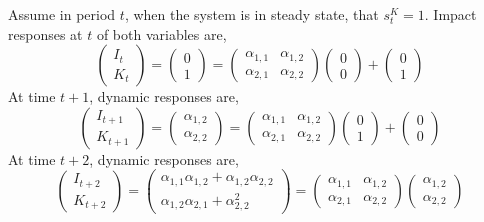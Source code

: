 \documentclass{article}
\begin{document}
Assume in period $t$, when the system is in steady state, that $s_t^K = 1$. Impact responses at $t$ of both variables are,
\begin{equation}\label{eq:K_responses_zero}
\begin{pmatrix}
I_t \\
K_t
\end{pmatrix} = \begin{pmatrix}
0 \\
1
\end{pmatrix} = \begin{pmatrix}
\alpha_{1,1} & \alpha_{1,2} \\
\alpha_{2,1} & \alpha_{2,2}
\end{pmatrix}\begin{pmatrix}
0 \\
0
\end{pmatrix} + \begin{pmatrix}
0 \\ 
1
\end{pmatrix}
\end{equation} 
At time $t + 1$, dynamic responses are,
\begin{equation}\label{eq:K_responses_one}
\begin{pmatrix}
I_{t+1} \\
K_{t+1}
\end{pmatrix} = \begin{pmatrix}
\alpha_{1,2} \\
\alpha_{2,2}
\end{pmatrix} = \begin{pmatrix}
\alpha_{1,1} & \alpha_{1,2} \\
\alpha_{2,1} & \alpha_{2,2}
\end{pmatrix}\begin{pmatrix}
0 \\
1
\end{pmatrix} + \begin{pmatrix}
0 \\ 
0
\end{pmatrix}
\end{equation} 
At time $t + 2$, dynamic responses are,
\begin{equation}\label{eq:K_responses_two}
\begin{pmatrix}
I_{t+2} \\
K_{t+2}
\end{pmatrix} = \begin{pmatrix}
\alpha_{1,1}\alpha_{1,2} + \alpha_{1,2}\alpha_{2,2} \\
\alpha_{1,2}\alpha_{2,1} + \alpha_{2,2}^2
\end{pmatrix} = \begin{pmatrix}
\alpha_{1,1} & \alpha_{1,2} \\
\alpha_{2,1} & \alpha_{2,2}
\end{pmatrix}\begin{pmatrix}
\alpha_{1,2} \\
\alpha_{2,2}
\end{pmatrix} 
\end{equation} 
\end{document}
